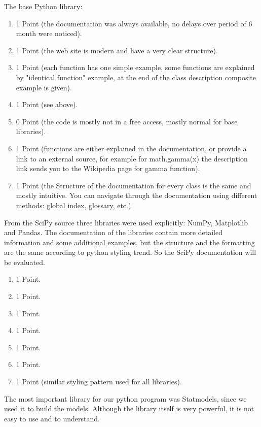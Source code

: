 \documentclass{article}
\begin{document}
The base Python library:
\begin{enumerate}
    \item 1 Point (the documentation was always available, no delays over period of 6 month were noticed).
    \item 1 Point (the web site is modern and have a very clear structure).
    \item 1 Point (each function has one simple example, some functions are explained by "identical function" example, at the end of the class description composite example is given).
    \item 1 Point (see above).
    \item 0 Point (the code is mostly not in a free access, mostly normal for base libraries).
    \item 1 Point (functions are either explained in the documentation, or provide a link to an external source, for example for math.gamma(x) the description link sends you to the Wikipedia page for gamma function).
    \item 1 Point (the Structure of the documentation for every class is the same and  mostly intuitive. You can navigate through the documentation using different methods: global index, glossary, etc.).
\end{enumerate}
From the SciPy source three libraries were used explicitly: NumPy, Matplotlib and Pandas. The documentation of the libraries contain more detailed information and some additional examples, but the structure and the formatting are the same according to python styling trend. So the SciPy documentation will be evaluated.
\begin{enumerate}
    \item 1 Point.
    \item 1 Point.
    \item 1 Point.
    \item 1 Point.
    \item 1 Point.
    \item 1 Point.
    \item 1 Point (similar styling pattern used for all libraries).
\end{enumerate}
The most important library for our python program was Statmodels, since we used it to build the models. Although the library itself is very powerful, it is not easy to use and to understand.
\end{document}
